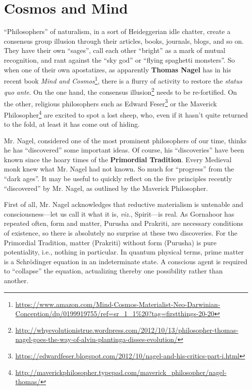 \section{Cosmos and Mind}

``Philosophers'' of naturalism, in a sort of Heideggerian idle chatter, create a consensus group illusion through their articles, books, journals, blogs, and so on. They have their own ``sages'', call each other ``bright'' as a mark of mutual recognition, and rant against the ``sky god'' or ``flying spaghetti monsters''. So when one of their own apostatizes, as apparently \textbf{Thomas Nagel} has in his recent book \textit{Mind and Cosmos}\footnote{\url{https://www.amazon.com/Mind-Cosmos-Materialist-Neo-Darwinian-Conception/dp/0199919755/ref=sr\_1\_1\%20?tag=firstthings-20-20}}, there is a flurry of activity to restore the \emph{status quo ante}. On the one hand, the consensus illusion\footnote{\url{http://whyevolutionistrue.wordpress.com/2012/10/13/philosopher-thomas-nagel-goes-the-way-of-alvin-plantinga-disses-evolution/}} needs to be re-fortified. On the other, religious philosophers such as Edward Feser\footnote{\url{https://edwardfeser.blogspot.com/2012/10/nagel-and-his-critics-part-i.html}} or the Maverick Philosopher\footnote{\url{http://maverickphilosopher.typepad.com/maverick\_philosopher/nagel-thomas/}} are excited to spot a lost sheep, who, even if it hasn't quite returned to the fold, at least it has come out of hiding.

Mr. Nagel, considered one of the most prominent philosophers of our time, thinks he has ``discovered'' some important ideas. Of course, his ``discoveries'' have been known since the hoary times of the \textbf{Primordial Tradition}. Every Medieval monk knew what Mr. Nagel had not known. So much for ``progress'' from the ``dark ages''. It may be useful to quickly reflect on the five principles recently ``discovered'' by Mr. Nagel, as outlined by the Maverick Philosopher.

First of all, Mr. Nagel acknowledges that reductive materialism is untenable and consciousness---let us call it what it is, \emph{viz.}, Spirit---is real. As Gornahoor has repeated often, form and matter, Purusha and Prakriti, are necessary conditions of existence, so there is absolutely no surprise at these two discoveries. For the Primordial Tradition, matter (Prakriti) without form (Purusha) is pure potentiality, i.e., nothing in particular. In quantum physical terms, prime matter is a Schrödinger equation in an indeterminate state. A conscious agent is required to ``collapse'' the equation, actualizing thereby one possibility rather than another.

